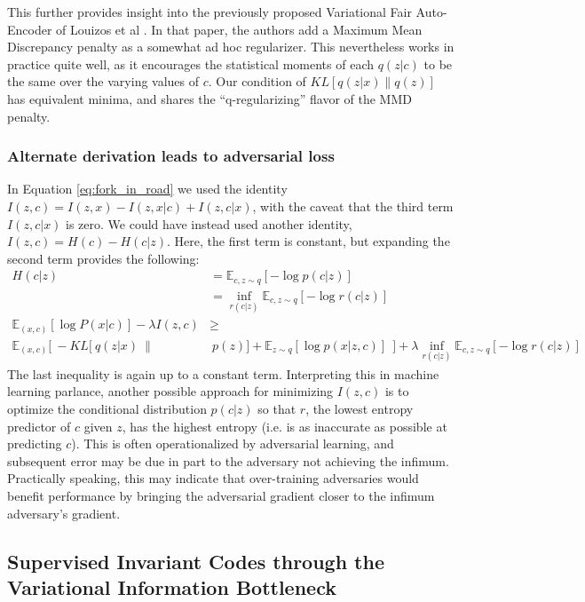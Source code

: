 This further provides insight into the previously proposed Variational Fair Auto-Encoder of Louizos et al \cite{louizos2015variational}. In that paper, the authors add a Maximum Mean Discrepancy penalty as a somewhat ad hoc regularizer. This nevertheless works in practice quite well, as it encourages the statistical moments of each $q(z|c)$ to be the same over the varying values of $c$. Our condition of $KL[ q(z|x) \| q(z) ]$ has equivalent minima, and shares the ``q-regularizing'' flavor of the MMD penalty.

\subsubsection{Alternate derivation leads to adversarial loss}
\label{sec:adv_loss}

In Equation \ref{eq:fork_in_road} we used the identity $I(z,c) = I(z, x) - I(z, x | c) + I(z, c |x)$, with the caveat that the third term $I(z,c|x)$ is zero. We could have instead used another identity, $I(z, c) = H(c) - H(c|z)$. Here, the first term is constant, but expanding the second term provides the following:
\begin{align}
H(c|z) & = \mathbb{E}_{c,z\sim q}[ -\log p(c|z) ]\\
& = \inf_{r(c|z)} \mathbb{E}_{c,z\sim q}[ -\log r(c|z) ]\\
\mathbb{E}_{(x,c)}[\log P(x|c)] - \lambda I(z,c) & \geq \nonumber \\
\mathbb{E}_{(x,c)}[ ~ -KL[~  q(z|x)~\|&~p(z)] + \mathbb{E}_{z\sim q}[\log p(x|z,c)]~~] + \lambda \inf_{r(c|z)} \mathbb{E}_{c,z\sim q}[ -\log r(c|z) ] \label{eq:adv_inf}
\end{align}
The last inequality is again up to a constant term. Interpreting this in machine learning parlance, another possible approach for minimizing $I(z, c)$ is to optimize the conditional distribution $p(c|z)$ so that $r$, the lowest entropy predictor of $c$ given $z$, has the highest entropy (i.e. is as inaccurate as possible at predicting $c$). This is often operationalized by adversarial learning, and subsequent error may be due in part to the adversary not achieving the infimum. Practically speaking, this may indicate that over-training adversaries would benefit performance by bringing the adversarial gradient closer to the infimum adversary's gradient. 

\subsection{Supervised Invariant Codes through the Variational Information Bottleneck}
\label{subsec:sup}


